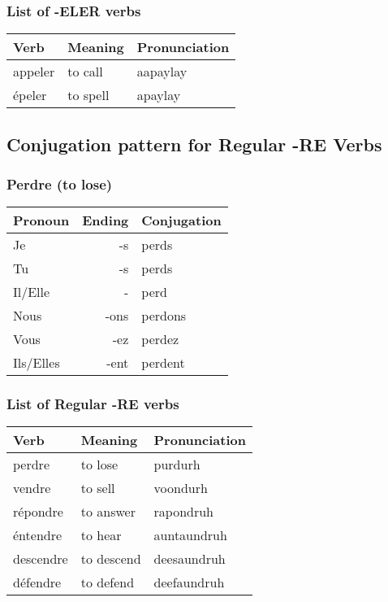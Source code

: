 \subsubsection{List of -ELER verbs}
\begin{longtable}{| l | l | l |}
\hline
Verb 		& Meaning 		& Pronunciation	\\
\hline
\endhead
appeler 	& to call		& aapaylay	\\
\'epeler 	& to spell		& apaylay	\\
\hline
\end{longtable}

\subsection{Conjugation pattern for Regular -RE Verbs}

\subsubsection{Perdre (to lose)}
\begin{tabular}{| l | r | l |}
\hline
Pronoun 	& 	Ending 	& 	Conjugation	\\ 	\hline
Je		    &	-s	    & 	perds     \\ 	\hline
Tu		    &	-s	    &	perds     \\	\hline
Il/Elle		&	-	    &	perd      \\	\hline
Nous		&	-ons	&	perdons   \\	\hline
Vous		&	-ez	    &	perdez    \\	\hline
Ils/Elles	&	-ent	&	perdent   \\	\hline
\end{tabular}

\subsubsection{List of Regular -RE verbs}
\begin{longtable}{| l | l | l |}
\hline
Verb 		& Meaning 		& Pronunciation	\\
\hline
\endhead
perdre      & to lose       & purdurh       \\ 	\hline
vendre      & to sell       & voondurh      \\	\hline
r\'epondre  & to answer     & rapondruh     \\	\hline
\'entendre  & to hear       & auntaundruh   \\	\hline
descendre   & to descend    & deesaundruh   \\	\hline
d\'efendre   & to defend     & deefaundruh   \\	\hline
\end{longtable}

